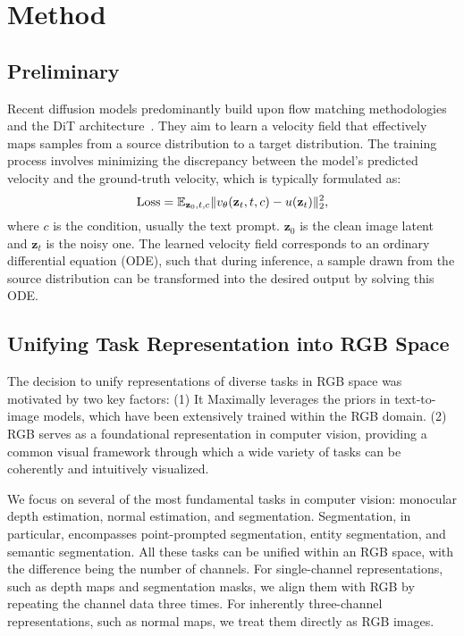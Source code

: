 \section{Method}

\subsection{Preliminary}

Recent diffusion models predominantly build upon flow matching methodologies~\cite{lipman2022flow, albergo2022building, liu2022flow} and the DiT architecture~\cite{peebles2023scalable}. They aim to learn a velocity field that effectively maps samples from a source distribution to a target distribution. The training process involves minimizing the discrepancy between the model’s predicted velocity and the ground-truth velocity, which is typically formulated as:
\begin{equation}
    {\rm Loss} = {\mathbb E}_{\mathbf z_0,t, c} \Vert v_\theta(\mathbf z_t,t,c) - u(\mathbf z_t) \Vert^2_2,
\end{equation}
where $c$ is the condition, usually the text prompt. $\mathbf z_0$ is the clean image latent and $\mathbf z_t$ is the noisy one. The learned velocity field corresponds to an ordinary differential equation (ODE), such that during inference, a sample drawn from the source distribution can be transformed into the desired output by solving this ODE.

\subsection{Unifying Task Representation into RGB Space}
The decision to unify representations of diverse tasks in RGB space was motivated by two key factors: (1) It Maximally leverages the priors in text-to-image models, which have been extensively trained within the RGB domain. (2) RGB serves as a foundational representation in computer vision, providing a common visual framework through which a wide variety of tasks can be coherently and intuitively visualized.

We focus on several of the most fundamental tasks in computer vision: monocular depth estimation, normal estimation, and segmentation. Segmentation, in particular, encompasses point-prompted segmentation, entity segmentation, and semantic segmentation. All these tasks can be unified within an RGB space, with the difference being the number of channels. For single-channel representations, such as depth maps and segmentation masks, we align them with RGB by repeating the channel data three times. For inherently three-channel representations, such as normal maps, we treat them directly as RGB images.

